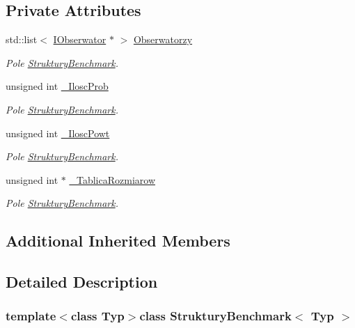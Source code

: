 \subsection*{Private Attributes}
\begin{DoxyCompactItemize}
\item 
std\-::list$<$ \hyperlink{class_i_obserwator}{I\-Obserwator} $\ast$ $>$ \hyperlink{class_struktury_benchmark_a5c96eb86dfccdad59d41d478ca8d66c3}{Obserwatorzy}
\begin{DoxyCompactList}\small\item\em Pole \hyperlink{class_struktury_benchmark}{Struktury\-Benchmark}. \end{DoxyCompactList}\item 
unsigned int \hyperlink{class_struktury_benchmark_a5b2aee5eb235c0ad6c56a4871aad6bd3}{\-\_\-\-Ilosc\-Prob}
\begin{DoxyCompactList}\small\item\em Pole \hyperlink{class_struktury_benchmark}{Struktury\-Benchmark}. \end{DoxyCompactList}\item 
unsigned int \hyperlink{class_struktury_benchmark_a49d86123ea73ecc57bc161dcf40fba01}{\-\_\-\-Ilosc\-Powt}
\begin{DoxyCompactList}\small\item\em Pole \hyperlink{class_struktury_benchmark}{Struktury\-Benchmark}. \end{DoxyCompactList}\item 
unsigned int $\ast$ \hyperlink{class_struktury_benchmark_a9077a191d28f29d9b2eba8d4e8f72ce8}{\-\_\-\-Tablica\-Rozmiarow}
\begin{DoxyCompactList}\small\item\em Pole \hyperlink{class_struktury_benchmark}{Struktury\-Benchmark}. \end{DoxyCompactList}\end{DoxyCompactItemize}
\subsection*{Additional Inherited Members}


\subsection{Detailed Description}
\subsubsection*{template$<$class Typ$>$class Struktury\-Benchmark$<$ Typ $>$}


